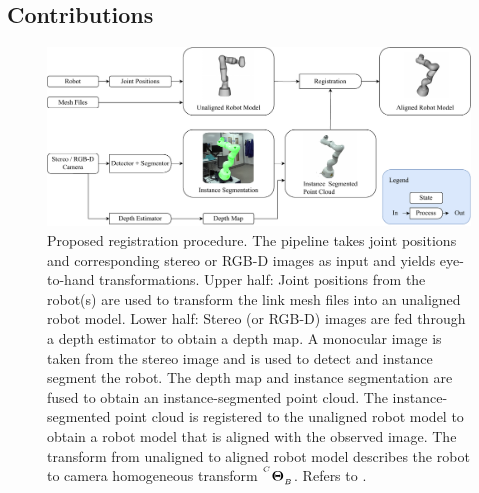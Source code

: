 







\subsection{Contributions}
\begin{figure}[tb]
    \centering
    \includegraphics[width=\textwidth]{chapter_1/fig/approach_refined.pdf}
    \caption{Proposed registration procedure. The pipeline takes joint positions and corresponding stereo or RGB-D images as input and yields eye-to-hand transformations. Upper half: Joint positions from the robot(s) are used to transform the link mesh files into an unaligned robot model. Lower half: Stereo (or RGB-D) images are fed through a depth estimator to obtain a depth map. A monocular image is taken from the stereo image and is used to detect and instance segment the robot. The depth map and instance segmentation are fused to obtain an instance-segmented point cloud. The instance-segmented point cloud is registered to the unaligned robot model to obtain a robot model that is aligned with the observed image. The transform from unaligned to aligned robot model describes the robot to camera homogeneous transform ${}^{^C}\mathbf{\Theta}_{_B}$. Refers to .}
    \label{c1:fig:calibration_pipeline}
\end{figure}
